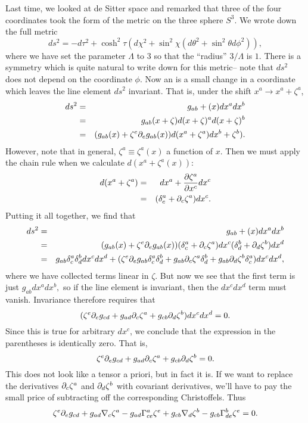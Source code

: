 Last time, we looked at de Sitter space and remarked that three of the four coordinates took the form of the metric on the three sphere $S^3$. We wrote down the full metric
$$ds^2=-d\tau^2+\cosh^2\tau \left(d\chi^2 + \sin^2\chi (d\theta^2+\sin^2\theta d\phi^2)\right),$$
where we have set the parameter $\Lambda$ to $3$ so that the ``radius'' $3/\Lambda$ is $1$.
There is a symmetry which is quite natural to write down for this metric-- note that $ds^2$ does not depend on the coordinate $\phi$. Now an  is a small change in a coordinate which leaves the line element $ds^2$ invariant. That is, under the shift $x^a\to x^a +\zeta^a$,
\begin{eqnarray*}
ds^2&=& g_{ab}+(x) dx^a dx^b\\
&=&g_{ab}(x+\zeta)d(x+\zeta)^a d(x+\zeta)^b\\
&=&(g_{ab}(x)+\zeta^e \partial_e g_{ab}(x)) d(x^a+\zeta^a) dx^b+\zeta^b).
\end{eqnarray*}
However, note that in general, $\zeta^a \equiv \zeta^a(x)$ a function of $x$. Then we must apply the chain rule when we calculate $d(x^a+\zeta^a(x)):$
\begin{eqnarray*}
d(x^a+\zeta^a)&=&dx^a+ \frac{\partial \zeta^a}{\partial x^c} dx^c\\
&=&(\delta^a_c +\partial_c \zeta^a)dx^c.
\end{eqnarray*}
Putting it all together, we find that
\begin{eqnarray*}
ds^2&=& g_{ab}+(x) dx^a dx^b\\
&=&(g_{ab}(x)+\zeta^e \partial_e g_{ab}(x)) (\delta^a_c + \partial_c \zeta^a)dx^c (\delta^b_d+\partial_d \zeta^b) dx^d\\
&=& g_{ab} \delta^a_c \delta^b_d dx^c dx^d + (\zeta^e \partial_e g_{ab} \delta^a_c \delta^b_d + g_{ab} \partial_c \zeta^a \delta^b_d + g_{ab} \partial_d \zeta^b \delta^a_c)dx^c dx^d,
\end{eqnarray*}
where we have collected terms linear in $\zeta$. But now we see that the first term is just $g_{ab} dx^a dx^b,$ so if the line element is invariant, then the $dx^c dx^d$ term must vanish. Invariance therefore requires that
$$(\zeta^e \partial_e g_{cd} + g_{ad} \partial_c \zeta^a +g_{cb} \partial_d \zeta^b)dx^c dx^d=0.$$
Since this is true for arbitrary $dx^c$, we conclude that the expression in the parentheses is identically zero. That is,
$$\zeta^e \partial_e g_{cd} + g_{ad} \partial_c \zeta^a +g_{cb} \partial_d \zeta^b=0.$$
This does not look like a tensor a priori, but in fact it is. If we want to replace the derivatives $\partial_c \zeta^a$ and $\partial_d \zeta^b$ with covariant derivatives, we'll have to pay the small price of subtracting off the corresponding Christoffels. Thus
$$\zeta^e \partial_e g_{cd} + g_{ad} \nabla_c \zeta^a - g_{ad}\Gamma^a_{ce} \zeta^e+g_{cb} \nabla_d \zeta^b - g_{cb} \Gamma^b_{de}\zeta^e=0.$$

